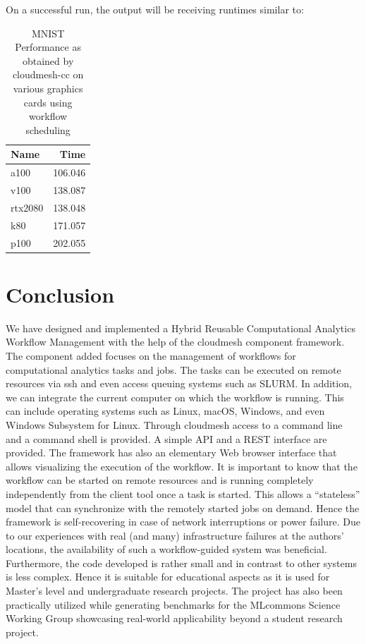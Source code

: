 On a successful run, the output will be receiving runtimes similar to:

\begin{table}[!ht]
\caption{MNIST Performance as obtained by cloudmesh-cc on various graphics cards using workflow scheduling}
    \centering
    \begin{tabular}{lr}
    \hline
        Name & Time \\ \hline
        a100 & 106.046 \\ 
        v100 & 138.087 \\ 
        rtx2080 & 138.048 \\
        k80 & 171.057 \\ 
        p100 & 202.055 \\
    \end{tabular}
    \label{table:mnist-times}
  \end{table}
  


% 


\section{Conclusion}

We have designed and implemented a Hybrid Reusable Computational
Analytics Workflow Management with the help of the cloudmesh
component framework. The component added focuses on the management of
workflows for computational analytics tasks and jobs. The tasks can be
executed on remote resources via ssh and even access queuing systems
such as SLURM. In addition, we can integrate the current computer on
which the workflow is running. This can include operating systems such
as Linux, macOS, Windows, and even Windows Subsystem for Linux. Through
cloudmesh access to a command line and a command shell is provided. A
simple API and a REST interface are provided. The framework has also an
elementary Web browser interface that allows visualizing the
execution of the workflow.  It is important to know that the workflow
can be started on remote resources and is running completely
independently from the client tool once a task is started. This allows a
``stateless'' model that can synchronize with the remotely started jobs
on demand. Hence the framework is self-recovering in case of network
interruptions or power failure. Due to our experiences with real (and
many) infrastructure failures at the authors' locations, the
availability of such a workflow-guided system was
beneficial. Furthermore, the code developed is rather small and in
contrast to other systems is less complex. Hence it is suitable for
educational aspects as it is used for Master's level and undergraduate
research projects. The project has also been practically utilized while
generating benchmarks for the MLcommons Science Working Group
showcasing real-world applicability beyond a student research project.


